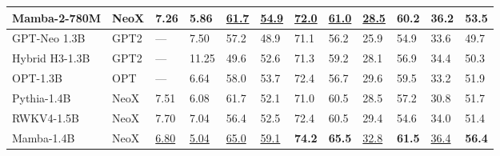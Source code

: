 \documentclass{article}
\begin{document}
\begin{table}[ht]
{\begin{tabular}{@{}llllllllllll@{}}
      \textbf{Mamba-2-780M} & NeoX        & \textbf{7.26}              & \textbf{5.86}              & \underline{61.7}          & \underline{54.9}           & \underline{72.0}          & \underline{61.0}          & \underline{28.5}                      & \textbf{60.2}                           & \textbf{36.2}                           & \textbf{53.5} \\
      \midrule
      GPT-Neo 1.3B          & GPT2        & ---                        & 7.50                       & 57.2                      & 48.9                       & 71.1                      & 56.2                      & 25.9                                  & 54.9                                    & 33.6                                    & 49.7 \\
      Hybrid H3-1.3B        & GPT2        & ---                        & 11.25                      & 49.6                      & 52.6                       & 71.3                      & 59.2                      & 28.1                                  & 56.9                                    & 34.4                                    & 50.3 \\
      OPT-1.3B              & OPT         & ---                        & 6.64                       & 58.0                      & 53.7                       & 72.4                      & 56.7                      & 29.6                                  & 59.5                                    & 33.2                                    & 51.9 \\
      Pythia-1.4B           & NeoX        & 7.51                       & 6.08                       & 61.7                      & 52.1                       & 71.0                      & 60.5                      & 28.5                                  & 57.2                                    & 30.8                                    & 51.7 \\
      RWKV4-1.5B            & NeoX        & 7.70                       & 7.04                       & 56.4                      & 52.5                       & 72.4                      & 60.5                      & 29.4                                  & 54.6                                    & 34.0                                    & 51.4 \\
      Mamba-1.4B            & NeoX        & \underline{6.80}           & \underline{5.04}           & \underline{65.0}          & \underline{59.1}           & \textbf{74.2}             & \textbf{65.5}             & \underline{32.8}                      & \textbf{61.5}                           & \underline{36.4}                        & \textbf{56.4} \\

\end{tabular}}
\end{table}
\end{document}

